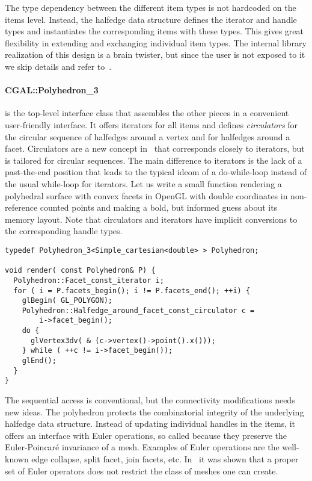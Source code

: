 The type dependency between the different item types is not hardcoded
on the items level. Instead, the halfedge data structure defines the
iterator and handle types and instantiates the corresponding items
with these types. This gives great flexibility in extending and
exchanging individual item types. The internal library
realization of this design is a brain twister, but since the user is
not exposed to it we skip details and refer to~\cite{k-ugpdd-99}.

\paragraph*{CGAL::Polyhedron\_3} is the top-level interface class that
assembles the other pieces in a convenient user-friendly interface.
It offers iterators for all items and defines \emph{circulators} for
the circular sequence of halfedges around a vertex and for halfedges
around a facet. Circulators are a new concept in \cgal\ that
corresponds closely to iterators, but is tailored for circular
sequences.  The main difference to iterators is the lack of a
past-the-end position that leads to the typical ideom of a
do-while-loop instead of the usual while-loop for iterators.  Let us
write a small function rendering a polyhedral surface with convex
facets in OpenGL with double coordinates in non-reference counted
points and making a bold, but informed guess about its memory layout.
Note that circulators and iterators have implicit conversions to the
corresponding handle types.
%
\begin{lstlisting}
typedef Polyhedron_3<Simple_cartesian<double> > Polyhedron;

void render( const Polyhedron& P) {
  Polyhedron::Facet_const_iterator i;
  for ( i = P.facets_begin(); i != P.facets_end(); ++i) {
    glBegin( GL_POLYGON);
    Polyhedron::Halfedge_around_facet_const_circulator c = 
        i->facet_begin();
    do {
      glVertex3dv( & (c->vertex()->point().x()));
    } while ( ++c != i->facet_begin());
    glEnd();
  }
}
\end{lstlisting}%
%
The sequential access is conventional, but the connectivity
modifications needs new ideas. The polyhedron protects the
combinatorial integrity of the underlying halfedge data structure.
Instead of updating individual handles in the items, it offers an
interface with Euler operations, so called because they preserve the
Euler-Poincar\'e invariance of a mesh. Examples of Euler operations
are the well-known edge collapse, split facet, join facets, etc.
In~\cite{Maentylae88} it was shown that a proper set of Euler
operators does not restrict the class of meshes one can create.

